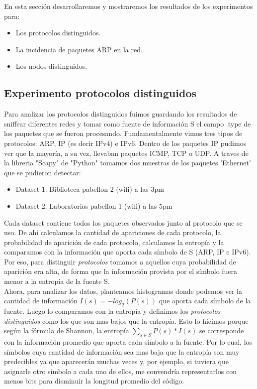 En esta sección desarrollaremos y mostraremos los resultados de los experimentos para:

\begin{itemize}
\item Los protocolos distinguidos.
\item La incidencia de paquetes ARP en la red.
\item Los nodos distinguidos.
\end{itemize}

\subsection{Experimento protocolos distinguidos}

Para analizar los protocolos distinguidos fuimos guardando los resultados de sniffear diferentes redes y tomar como fuente de información S el campo .type de los paquetes que se fueron procesando. Fundamentalmente vimos tres tipos de protocolos: ARP, IP (es decir IPv4) e IPv6. Dentro de los paquetes IP pudimos ver que la mayoría, a su vez, llevaban paquetes ICMP, TCP o UDP. A traves de la libreria "Scapy" de "Python" tomamos dos muestras de los paquetes 'Ethernet' que se pudieron detectar:

\begin{itemize}
\item Dataset 1: Biblioteca pabellon 2 (wifi) a las 3pm
\item Dataset 2: Laboratorios pabellon 1 (wifi) a las 5pm
\end{itemize}

Cada dataset contiene todos los paquetes observados junto al protocolo que se uso. De ahí calculamos la cantidad de apariciones de cada protocolo, la probabilidad de aparición de cada protocolo, calculamos la entropía y la comparamos con la información que aporta cada símbolo de S (ARP, IP e IPv6).\\

Por eso, para distinguir \emph{protocolos} tomamos a
aquellos cuya probabilidad de aparición era alta, de forma que la información provista por el símbolo fuera menor a la entropía de la fuente S.\\

Ahora, para analizar los datos, planteamos histogramas donde podemos ver la cantidad de información $I(s) = -log_2(P(s))$ que aporta cada símbolo de la fuente. Luego lo comparamos con la entropía y definimos los \emph{protocolos distinguidos} como los que son mas bajos que la entropía. Esto lo hicimos porque según la fórmula de Shannon, la entropía $\sum\limits_{s \in S} P(s) * I(s)$ se corresponde con la información promedio que aporta cada símbolo a la fuente. Por lo cual, los símbolos cuya cantidad de información sea mas baja que la entropía son muy predecibles ya que aparecerán muchas veces y, por ejemplo, si tuviera que asignarle otro símbolo a cada uno de ellos, me convendría representarlos con menos bits para disminuir la longitud promedio del código. \\

